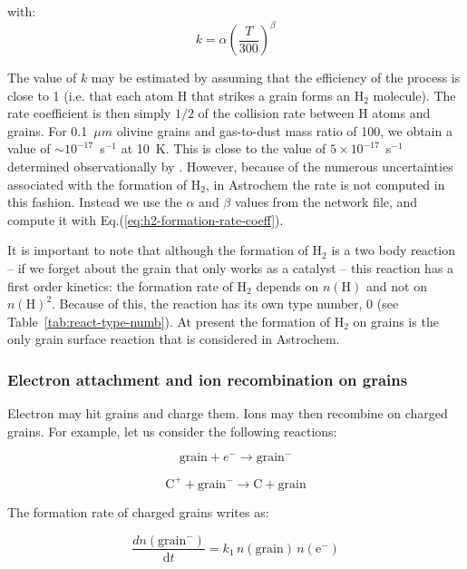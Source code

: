 \documentclass[a4paper,12pt]{article}
\newcommand{\conc}[1]{n(\mathrm{#1})}
\begin{document}
\noindent
with:
\begin{equation}
  k = \alpha  \left( \frac{T}{300} \right)^\beta
  \label{eq:h2-formation-rate-coeff}
\end{equation}

The value of $k$ may be estimated by assuming that the efficiency of
the process is close to 1 (i.e. that each atom H that strikes a grain
forms an H$_{2}$ molecule). The rate coefficient is then simply $1/2$
of the collision rate between H atoms and grains. For 0.1~$\mu m$
olivine grains and gas-to-dust mass ratio of 100, we obtain a value of
$\sim 10^{-17}$~s$^{-1}$ at 10~K. This is close to the value of $5
\times 10^{-17}$~s$^{-1}$ determined observationally by
\citet{Jura74}. However, because of the numerous uncertainties
associated with the formation of H$_{2}$, in Astrochem the rate is not
computed in this fashion. Instead we use the $\alpha$ and $\beta$
values from the network file, and compute it with
Eq.(\ref{eq:h2-formation-rate-coeff}).

It is important to note that although the formation of H$_{2}$ is a
two body reaction -- if we forget about the grain that only works as a
catalyst -- this reaction has a first order kinetics: the formation
rate of H$_{2}$ depends on $\conc{H}$ and not on
$\conc{H}^{2}$. Because of this, the reaction has its own type number,
0 (see Table~\ref{tab:react-type-numb}). At present the formation of
H$_{2}$ on grains is the only grain surface reaction that is
considered in Astrochem.

\subsubsection{Electron attachment and ion recombination on grains}
\label{sec:electr-attachm-ion}

Electron may hit grains and charge them. Ions may then recombine on
charged grains. For example, let us consider the following reactions:

\begin{equation}
  \mathrm{grain} + e^{-} \rightarrow \mathrm{grain}^{-}
\end{equation}

\begin{equation}
  \mathrm{C^{+}} + \mathrm{grain}^{-} \rightarrow \mathrm{C} + \mathrm{grain}
\end{equation}
 
The formation rate of charged grains writes as:

\begin{equation}
  \frac{d \conc{grain^{-}}}{\mathrm{d}t} = k_{1} \, \conc{grain} \, \conc{e^{-}}
\end{equation}
\end{document}
